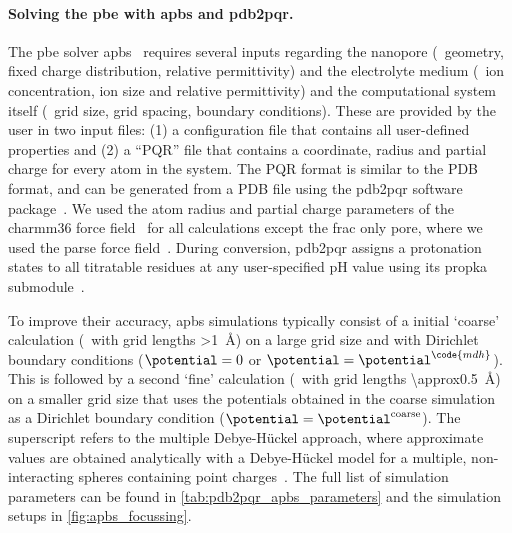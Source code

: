 \paragraph{Solving the \gls{pbe} with \gls{apbs} and \gls{pdb2pqr}.}
%
The \gls{pbe} solver \gls{apbs}~\cite{Jurrus-2018,Baker-2001} requires several inputs regarding the nanopore
(\ie~geometry, fixed charge distribution, relative permittivity) and the electrolyte medium (\ie~ion
concentration, ion size and relative permittivity) and the computational system itself (\ie~grid size, grid
spacing, boundary conditions). These are provided by the user in two input files: (1) a configuration file
that contains all user-defined properties and (2) a ``PQR'' file that contains a coordinate, radius and
partial charge for every atom in the system. The PQR format is similar to the PDB format, and can be generated
from a PDB file using the \gls{pdb2pqr} software package~\cite{Jurrus-2018,Dolinsky-2004,Dolinsky-2007}. We
used the atom radius and partial charge parameters of the \gls{charmm36} force field~\cite{Huang-2013} for all
calculations except the \gls{frac} only pore, where we used the \gls{parse} force
field~\cite{Sitkoff-1994,Sitkoff-1996}. During conversion, \gls{pdb2pqr} assigns a protonation states to all
titratable residues at any user-specified pH value using its \gls{propka} submodule~\cite{Li-2005}.

To improve their accuracy, \gls{apbs} simulations typically consist of a initial `coarse' calculation
(\ie~with grid lengths \SI{>1}{\angstrom}) on a large grid size and with Dirichlet boundary conditions
($\potential = 0$ or $\potential = \potential^{\code{mdh}}$). This is followed by a second `fine' calculation
(\ie~with grid lengths \SI{\approx0.5}{\angstrom}) on a smaller grid size that uses the potentials obtained in
the coarse simulation as a Dirichlet boundary condition ($\potential = \potential^{\mathrm{coarse}}$). The
 superscript refers to the multiple Debye-H\"{u}ckel approach, where approximate values are obtained
analytically with a Debye-H\"{u}ckel model for a multiple, non-interacting spheres containing point
charges~\cite{Baker-2001,Baker-2005,Stone-2010}. The full list of simulation parameters can be found in
\cref{tab:pdb2pqr_apbs_parameters} and the simulation setups in \cref{fig:apbs_focussing}.

